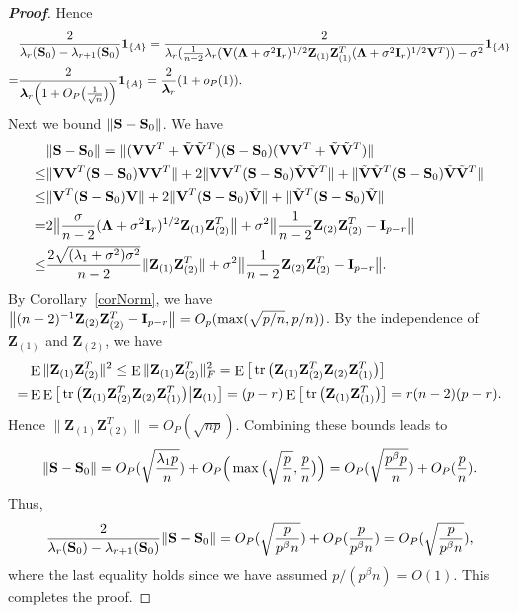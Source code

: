 \documentclass[review]{elsarticle}
\DeclareMathOperator{\mytr}{tr}
\DeclareMathOperator{\myE}{E}
\newcommand{\bZ}{\mathbf{Z}}
\newcommand{\bfsym}[1]{\ensuremath{\boldsymbol{#1}}}
\def\blambda {\bfsym {\lambda}}        \def\bLambda {\bfsym {\Lambda}}
\theoremstyle{plain}
\theoremstyle{definition}
\theoremstyle{remark}
\begin{document}
\begin{appendices}
\begin{proof}[\textbf{Proof}]
        Hence
$$
\begin{aligned}
    &\frac{2}{\lambda_r(\BS_0)-\lambda_{r+1}(\BS_0)}\mathbf{1}_{\{A\}}
    =
    \frac{2}{
        \lambda_r(\frac{1}{n-2}\lambda_r(\BV(\bLambda+\sigma^2 \BI_r)^{1/2}\bZ_{(1)} \bZ_{(1)}^T(\bLambda+\sigma^2 \BI_r)^{1/2}\BV^T))-\sigma^2}\mathbf{1}_{\{A\}}\\
    =&\frac{2}{\blambda_r\Big(1+O_P\big(\frac{1}{\sqrt{n}}\big)\Big)}\mathbf{1}_{\{A\}}
    =\frac{2}{\blambda_r}(1+o_P(1)).
\end{aligned}
    $$
    Next we bound $\|\mathbf{S}-\mathbf{S}_0\|$. 
    We have
    $$
    \begin{aligned}
        &\|\BS-\BS_0\|=
        \|(\BV\BV^T+\tilde{\BV}\tilde{\BV}^T)(\BS-\BS_0)(\BV\BV^T+\tilde{\BV}\tilde{\BV}^T)\|\\
        \leq& \|\BV\BV^T (\BS-\BS_0) \BV\BV^T\|+2 \|\BV\BV^T (\BS-\BS_0) \tilde{\BV}\tilde{\BV}^T\|+\|\tilde{\BV}\tilde{\BV}^T (\BS-\BS_0) \tilde{\BV}\tilde{\BV}^T\|\\
        \leq& \|\BV^T (\BS-\BS_0) \BV\|+2 \|\BV^T (\BS-\BS_0) \tilde{\BV}\|+\|\tilde{\BV}^T (\BS-\BS_0) \tilde{\BV}\|\\
        = &
        2\big\|\frac{\sigma}{n-2}(\bLambda+\sigma^2 \BI_r)^{1/2}\bZ_{(1)} \bZ_{(2)}^T\big\|+
        \sigma^2\big\|\frac{1}{n-2}\bZ_{(2)} \bZ_{(2)}^T- \BI_{p-r}\big\|\\
        \leq & \frac{2\sqrt{(\lambda_1+\sigma^2)\sigma^2}}{n-2}\|\bZ_{(1)}\bZ_{(2)}^T\|+
        \sigma^2\big\|\frac{1}{n-2}\bZ_{(2)} \bZ_{(2)}^T- \BI_{p-r}\big\|.
    \end{aligned}
    $$
    By Corollary~\ref{corNorm}, we have $\big\|(n-2)^{-1}\bZ_{(2)} \bZ_{(2)}^T- \BI_{p-r}\big\|=O_p(\max(\sqrt{p/n},p/n))$.
    By the independence of $\bZ_{(1)}$ and $\bZ_{(2)}$, we have
    $$
    \begin{aligned}
        &\myE \|\bZ_{(1)}\bZ_{(2)}^T\|^2\leq
    \myE \|\bZ_{(1)}\bZ_{(2)}^T\|_F^2
    =
    \myE \big[ \mytr\big(\bZ_{(1)}\bZ_{(2)}^T\bZ_{(2)}\bZ_{(1)}^T\big) \big]\\
        =&
        \myE\myE \big[ \mytr\big(\bZ_{(1)}\bZ_{(2)}^T\bZ_{(2)}\bZ_{(1)}^T\big)\big|\BZ_{(1)} \big]
        =(p-r)
    \myE \big[ \mytr\big(\bZ_{(1)}\bZ_{(1)}^T\big) \big]
        =r(n-2)(p-r).
    \end{aligned}
    $$
    Hence $\|\bZ_{(1)}\bZ_{(2)}^T\|=O_P(\sqrt{np})$.
    Combining these bounds leads to
    $$
    \|\mathbf{S}-\mathbf{S}_0\|=
 O_P(\sqrt{\frac{\lambda_1 p}{n}})+O_P\Big(\max\big(\sqrt{\frac{p}{n}},\frac{p}{n}\big)\Big)
    =
    O_P(\sqrt{\frac{ p^{\beta}p}{n}})+O_P(\frac{p}{n}).
    $$
    Thus,
    $$
   \frac{2}{\lambda_r(\mathbf{S}_0)-\lambda_{r+1}(\mathbf{S}_0)}\|\mathbf{S}-\mathbf{S}_0\|=
    O_P(\sqrt{\frac{p}{p^{\beta}n}})+O_P(\frac{p}{p^{\beta}n})=
O_P(\sqrt{\frac{p}{p^{\beta}n}}),
    $$
    where the last equality holds since we have assumed $p/(p^{\beta}n)=O(1)$.
    This completes the proof.


\end{proof}
\end{appendices}
\end{document}
